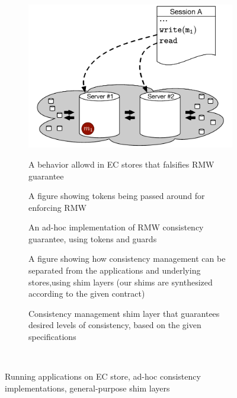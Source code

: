 \begin{figure}
\centering
\begin{subfigure}[b]{0.3\textwidth}
\includegraphics[scale=0.2]{../Figures/System_example.pdf}
\label{fig:rmw_falsified}
\caption{A behavior allowd in EC stores that falsifies RMW guarantee}
\end{subfigure}\quad
\begin{subfigure}[b]{0.3\textwidth}
A figure showing tokens being passed around for enforcing RMW
\label{fig:addhoc_impl}
\caption{An ad-hoc implementation of RMW consistency guarantee, using
tokens and guards}
\end{subfigure}\quad
\begin{subfigure}[b]{0.3\textwidth}
A figure showing how consistency management can be separated from the
applications and underlying stores,using shim layers (our shims are
synthesized according to the given contract)
\label{fig:shim_impl}
\caption{Consistency management shim layer that guarantees desired
levels of consistency, based on the given specifications}
\end{subfigure}~
\caption{Running applications on EC store, ad-hoc consistency
implementations, general-purpose shim layers}



\end{figure}

